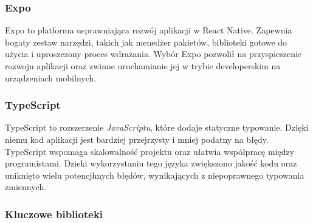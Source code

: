 \subsubsection{Expo}

Expo to platforma usprawniająca rozwój aplikacji w React Native. Zapewnia bogaty zestaw narzędzi, takich jak menedżer pakietów, biblioteki gotowe do użycia i uproszczony proces wdrażania. Wybór Expo pozwolił na przyspieszenie rozwoju aplikacji oraz zwinne uruchamianie jej w trybie developerskim na urządzeniach mobilnych.

\subsubsection{TypeScript}

TypeScript to rozszerzenie \textit{JavaScriptu}, które dodaje statyczne typowanie. Dzięki niemu kod aplikacji jest bardziej przejrzysty i mniej podatny na błędy. TypeScript wspomaga skalowalność projektu oraz ułatwia współpracę między programistami. Dzieki wykorzystaniu tego języka zwiększono jakość kodu oraz uniknięto wielu potencjhnych błędów, wynikających z niepoprawnego typowania zmiennych. 

\subsubsection{Kluczowe biblioteki}

